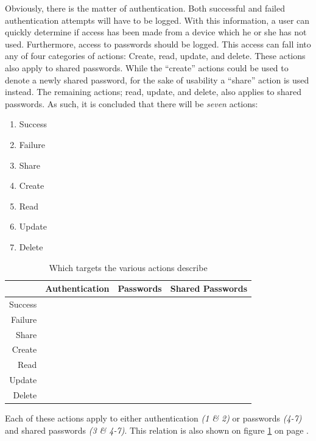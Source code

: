 		Obviously, there is the matter of authentication. Both successful and failed authentication attempts will have to be logged. With this information, a user can quickly determine if access has been made from a device which he or she has not used. Furthermore, access to passwords should be logged. This access can fall into any of four categories of actions: Create, read, update, and delete. These actions also apply to shared passwords. While the ``create'' actions could be used to denote a newly shared password, for the sake of usability a ``share'' action is used instead. The remaining actions; read, update, and delete, also applies to shared passwords. As such, it is concluded that there will be \emph{seven} actions:
		\begin{enumerate}
			\item Success
			\item Failure
			\item Share
			\item Create
			\item Read
			\item Update
			\item Delete
		\end{enumerate}

		\begin{table}
			\begin{tabular}{r | c | c | c }
							& \textbf{Authentication} 		& \textbf{Passwords} 		& \textbf{Shared Passwords} 	\\
				\hline
				Success 	& \cmark 						& \xmark 					& \xmark 						\\
				Failure 	& \cmark 						& \xmark 					& \xmark 						\\
				Share 		& \xmark 						& \xmark 					& \cmark 						\\
				Create 		& \xmark 						& \cmark 					& \xmark 						\\
				Read 		& \xmark 						& \cmark 					& \cmark 						\\
				Update 		& \xmark 						& \cmark 					& \cmark 						\\
				Delete 		& \xmark 						& \cmark 					& \cmark 						\\
			\end{tabular}
			\caption{Which targets the various actions describe}
			\label{table:actions}
		\end{table}

		Each of these actions apply to either authentication \emph{(1 \& 2)} or passwords \emph{(4-7)} and shared passwords \emph{(3 \& 4-7)}. This relation is also shown on figure \ref{table:actions} on page \pageref{table:actions}.
		
